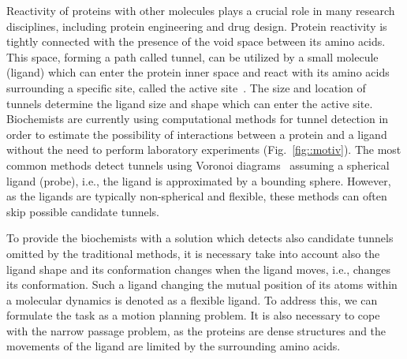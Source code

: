 \documentclass[usletter, 10pt, conference]{ieeeconf} %
\begin{document}
Reactivity of proteins with other molecules plays a crucial role in many research disciplines, including protein engineering and drug design.
Protein reactivity is tightly connected with the presence of the void space between its amino acids. 
This space, forming a path called tunnel, can be utilized by a small molecule (ligand) which can enter the protein inner space and react with its amino acids surrounding a specific site, called the active site~\cite{gora2013gates}.
The size and location of tunnels determine the ligand size and shape which can enter the active site.
Biochemists are currently using computational methods for tunnel detection in order to estimate the possibility of interactions between a protein and a ligand without the need to perform laboratory experiments (Fig.~\ref{fig::motiv}).
The most common methods detect tunnels using Voronoi diagrams~\cite{yaffe2008,caver3} assuming a spherical ligand (probe), i.e., the ligand is approximated by a bounding sphere.
However, as the ligands are typically non-spherical and flexible, these methods can often skip possible candidate tunnels.

To provide the biochemists with a solution which detects also candidate tunnels omitted by the traditional methods, it is necessary take into account also the ligand shape and its conformation changes when the ligand moves, i.e., changes its conformation.
Such a ligand changing the mutual position of its atoms within a molecular dynamics is denoted as a flexible ligand.
To address this, we can formulate the task as a motion planning problem.
It is also necessary to cope with the narrow passage problem, as the proteins are dense structures and the movements of the ligand are limited by the surrounding amino acids.
\end{document}
